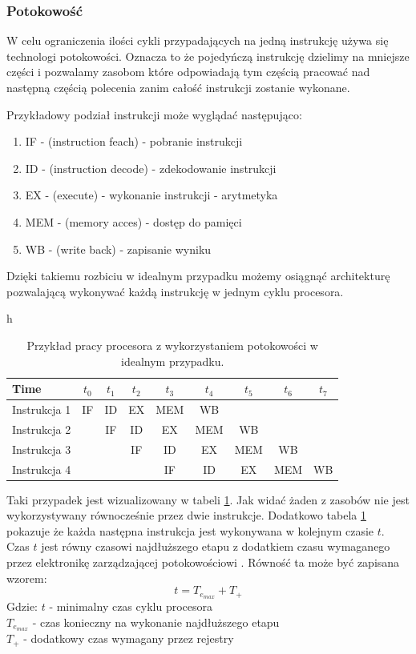 \documentclass[a4paper,12pt]{article}
\begin{document}
\subsubsection{Potokowość}

W celu ograniczenia ilości cykli przypadających na jedną instrukcję używa się technologi potokowości. 
Oznacza to że pojedyńczą instrukcję dzielimy na mniejsze części i pozwalamy zasobom które odpowiadają tym częścią pracować nad następną częścią polecenia zanim całość instrukcji zostanie wykonane.

Przykładowy podział instrukcji może wyglądać następująco:
\begin{enumerate}
        \item IF - (instruction feach) - pobranie instrukcji
        \item ID - (instruction decode) -  zdekodowanie instrukcji
        \item EX - (execute) - wykonanie instrukcji - arytmetyka
        \item MEM - (memory acces) - dostęp do pamięci
        \item WB - (write back) - zapisanie wyniku
\end{enumerate}

Dzięki takiemu rozbiciu w idealnym przypadku możemy osiągnąć architekturę pozwalającą wykonywać każdą instrukcję w jednym cyklu procesora. 

\begin{table}{h}
        \centering
        \caption{Przykład pracy procesora z wykorzystaniem potokowości w idealnym przypadku.}
        \label{pipelining}
        \begin{tabular}{lcccccccc}
                Time & $t_0$&$t_1$&$t_2$&$t_3$&$t_4$&$t_5$&$t_6$&$t_7$ \\ \hline
                Instrukcja 1 & IF & ID & EX & MEM & WB &    & \\
                Instrukcja 2 &    & IF & ID & EX & MEM & WB & \\
                Instrukcja 3 &    &    & IF & ID & EX & MEM & WB \\
                Instrukcja 4 &    &    &    & IF & ID & EX & MEM & WB
        \end{tabular}
\end{table}


Taki przypadek jest wizualizowany w tabeli \ref{pipelining}. Jak widać żaden z zasobów nie jest wykorzystywany równocześnie przez dwie instrukcje.
Dodatkowo tabela \ref{pipelining} pokazuje że każda następna instrukcja jest wykonywana w kolejnym czasie $t$. 
Czas $t$ jest równy czasowi najdłuższego etapu z dodatkiem czasu wymaganego przez elektronikę zarządzającej potokowościowi \cite{arch}.
Równość ta może być zapisana wzorem:
\begin{equation}
        t = T_{e_{max}} + T_{+}
\end{equation}
Gdzie:
        $t$ - minimalny czas cyklu procesora \\
        $T_{e_{max}}$ - czas konieczny na wykonanie najdłuższego etapu \\
        $T_{+}$ - dodatkowy czas wymagany przez rejestry \\
\end{document}

